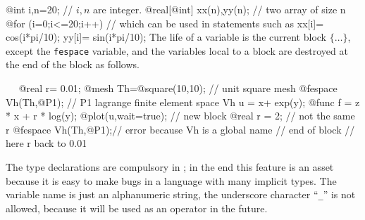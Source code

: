 \documentclass[a4paper,twoside,12pt]{book}
\begin{document}
\bFF
  @int i,n=20;               //  $ i,n$ are integer.
  @real[@int] xx(n),yy(n);    //  two array of size n
  @for (i=0;i<=20;i++)       // which can be used in statements such as
   { xx[i]= cos(i*pi/10); yy[i]= sin(i*pi/10); }
\eFF
The life of a variable is the current block $\{\ldots \}$, except the \texttt{fespace}
variable, and the variables local to a block are destroyed at the end of the block as follows.
\begin{example}~~
\bFF
@real r= 0.01;
@mesh Th=@square(10,10); // unit square mesh
@fespace Vh(Th,@P1);     // P1 lagrange finite  element space
Vh u = x+ exp(y);
@func f = z * x + r * log(y);
@plot(u,wait=true);
{  // new block
  @real r = 2; // not the same r
  @fespace Vh(Th,@P1);//  error because Vh is a global name
}  // end of block
//  here r back to 0.01
\eFF
\end{example}
The type declarations are  compulsory in \freefempp; in the end this feature is an asset because it is easy
to make bugs in a language with many implicit types.  The
variable name is just an alphanumeric  string, the
underscore character  ``\texttt{\_}'' is not allowed, because
it will be used as an operator in the future.\index{\_}
\end{document}
